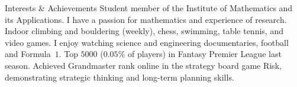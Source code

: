 \begin{rubric}{Interests \& Achievements}
\entry*[IMA]
Student member of the Institute of Mathematics and its Applications. I have a passion for mathematics and experience of research.
  Indoor climbing and bouldering (weekly), chess, swimming, table tennis, and video games.
  I enjoy watching science and engineering documentaries, football and Formula~$1$.
 Top $5000$ ($0.05\%$ of players) in Fantasy Premier League last season.
\entry*[] Achieved Grandmaster rank online in the strategy board game Risk, demonstrating strategic thinking and long-term planning skills.
\end{rubric}
